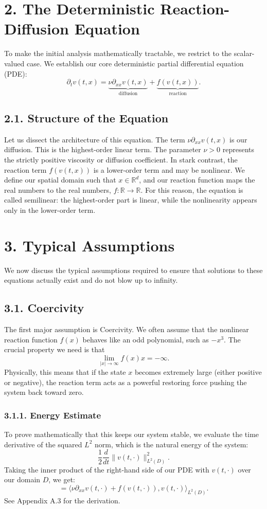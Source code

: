 \documentclass[11pt]{article}
\theoremstyle{definition}
\theoremstyle{remark}
\begin{document}
\section*{2. The Deterministic Reaction-Diffusion Equation}
To make the initial analysis mathematically tractable, we restrict to the scalar-valued case. We establish our core deterministic partial differential equation (PDE):
\[
\partial_t v(t,x)=\underbrace{\nu\partial_{xx}v(t,x)}_{\text{diffusion}}+\underbrace{f(v(t,x))}_{\text{reaction}}.
\]

\subsection*{2.1. Structure of the Equation}
Let us dissect the architecture of this equation. The term $\nu\partial_{xx}v(t,x)$ is our diffusion. This is the highest-order linear term. The parameter $\nu>0$ represents the strictly positive viscosity or diffusion coefficient. In stark contrast, the reaction term $f(v(t,x))$ is a lower-order term and may be nonlinear. We define our spatial domain such that $x\in\mathbb R^d$, and our reaction function maps the real numbers to the real numbers, $f:\mathbb R\to\mathbb R$.
For this reason, the equation is called semilinear: the highest-order part is linear, while the nonlinearity appears only in the lower-order term.

\section*{3. Typical Assumptions}
We now discuss the typical assumptions required to ensure that solutions to these equations actually exist and do not blow up to infinity.

\subsection*{3.1. Coercivity}
The first major assumption is Coercivity. We often assume that the nonlinear reaction function $f(x)$ behaves like an odd polynomial, such as $-x^3$. The crucial property we need is that
\[
\lim_{|x|\to\infty} f(x)x=-\infty.
\]
Physically, this means that if the state $x$ becomes extremely large (either positive or negative), the reaction term acts as a powerful restoring force pushing the system back toward zero.

\subsubsection*{3.1.1. Energy Estimate}
To prove mathematically that this keeps our system stable, we evaluate the time derivative of the squared $L^2$ norm, which is the natural energy of the system:
\[
\frac12\frac{d}{dt}\|v(t,\cdot)\|_{L^2(D)}^2.
\]
Taking the inner product of the right-hand side of our PDE with $v(t,\cdot)$ over our domain $D$, we get:
\[
=\langle\nu\partial_{xx}v(t,\cdot)+f(v(t,\cdot)),v(t,\cdot)\rangle_{L^2(D)}.
\]
See Appendix A.3 for the derivation.
\end{document}
